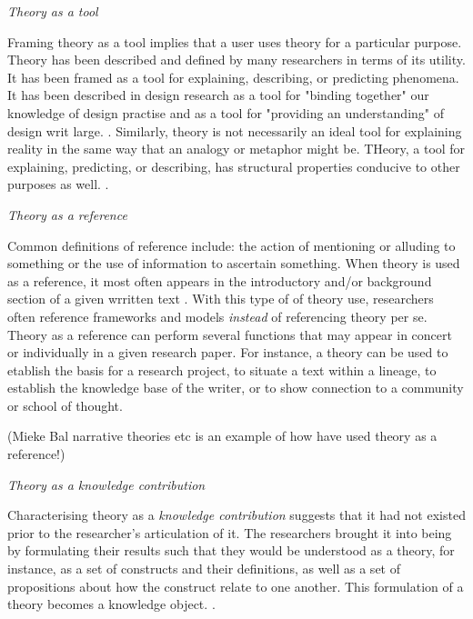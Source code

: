 \par \emph{Theory as a tool} \par
Framing theory as a tool implies that a user uses theory for a particular purpose. Theory has been described and defined by many researchers in terms of its utility. It has been framed as a tool for explaining, describing, or predicting phenomena. It has been described in design research as a tool for "binding together" our knowledge of design practise and as a tool for "providing an understanding" of design writ large. \autocite[p. 127]{beck_examining_2016}. Similarly, theory is not necessarily an ideal tool for explaining reality in the same way that an analogy or metaphor might be. THeory, a tool for explaining, predicting, or describing, has structural properties conducive to other purposes as well. \autocite[p. 127]{beck_examining_2016}.


\par \emph{Theory as a reference} \par
Common definitions of reference include: the action of mentioning or alluding to something or the use of information to ascertain something. When theory is used as a reference, it most often appears in the introductory and/or background section of a given wrritten text \autocite[p. 128]{beck_examining_2016}. With this type of of theory use, researchers often reference frameworks and models \emph{instead} of referencing theory per se. Theory as a reference can perform several functions that may appear in concert or individually in a given research paper. For instance, a theory can be used to etablish the basis for a research project, to situate a text within a lineage, to establish the knowledge base of the writer, or to show connection to a community or school of thought. 
\par

(Mieke Bal narrative theories etc is an example of how  have used theory as a reference!)

\par \emph{Theory as a knowledge contribution} \par
Characterising theory as a \emph{knowledge contribution} suggests that it had not existed prior to the researcher's articulation of it. The researchers brought it into being by formulating their results such that they would be understood as a theory, for instance, as a set of constructs and their definitions, as well as a set of propositions about how the construct relate to one another. This formulation of a theory becomes a knowledge object. \autocite[p. 128]{beck_examining_2016}.





